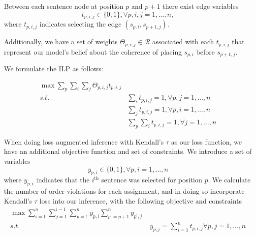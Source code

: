\documentclass[11pt]{article}
\begin{document}


Between each sentence node at position $p$ and $p+1$ there exist edge variables 
\begin{equation}
t_{p,i,j} \in \{0, 1\}, \forall p,i,j = 1,\ldots, n,
\end{equation}
where $t_{p,i,j}$ indicates selecting the edge $(s_{p,i}, s_{p+1,j})$.

Additionally, we have a set of weights $\Theta_{p,i,j} \in \mathcal{R}$ associated with each $t_{p,i,j}$ that represent our model's belief about the coherence of placing $s_{p,i}$ before $s_{p+1,j}$.

We formulate the ILP as follows:

\begin{equation}
\begin{split}
\max \sum_p \sum_i \sum_j \Theta_{p,i,j} t_{p,i,j}\\
s.t. & \sum_i t_{p,i,j} = 1, \forall p,j = 1,\ldots,n\\
     &  \sum_j t_{p,i,j} = 1, \forall p,i = 1,\ldots,n\\
     & \sum_p \sum_i t_{p,i,j} = 1, \forall j = 1,\ldots, n
\end{split}
\end{equation}


When doing loss augmented inference with Kendall's $\tau$ as our loss function, we have an additional objective function and set of constraints. We introduce a set of variables 
\begin{equation}
y_{p,i} \in \{0,1\}, \forall p,i = 1,\ldots,n 
\end{equation}
where $y_{p,i}$ indicates that the $i^{\textrm{th}}$ sentence was selected for position $p$.
We calculate the number of order violations for each assignment, and in doing so incorporate Kendall's $\tau$ loss into our inference, with the following objective and constraints
\begin{equation}
\begin{split}
\max \sum_{i=1}^n \sum_{j=1}^{i-1}\sum_{p=1}^n y_{p,i} \sum_{p^\prime = p+1}^n y_{p^\prime, j}\\
s.t. &\;  y_{p,j} = \sum_{i=1}^n t_{p,i,j} \forall p,j = 1,\ldots, n
\end{split}
\end{equation}

\end{document}
